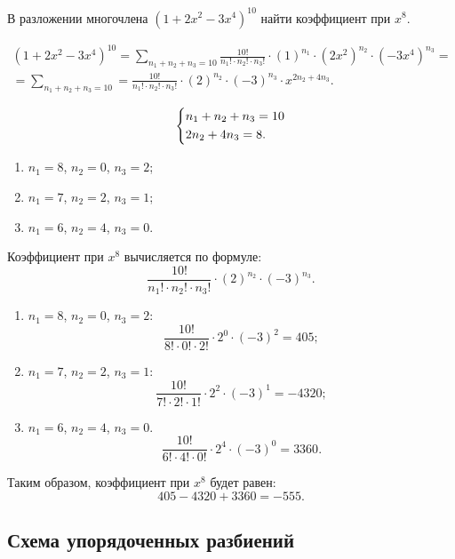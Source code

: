 \begin{example}
    В разложении многочлена \((1 + 2x^2 - 3x^4)^{10}\) найти коэффициент при \(x^8\).

    \begin{gather*}
        (1 + 2x^2 - 3x^4)^{10} =
        \sum_{n_1 + n_2 + n_3 = 10} \frac{10!}{n_1! \cdot n_2! \cdot n_3!} \cdot (1)^{n_1} \cdot (2x^2)^{n_2} \cdot (-3x^4)^{n_3} = \\ =
        \sum_{n_1 + n_2 + n_3 = 10} = \frac{10!}{n_1! \cdot n_2! \cdot n_3!} \cdot (2)^{n_2} \cdot (-3)^{n_3} \cdot x^{2n_2 + 4n_3}.
    \end{gather*}

    \[
        \begin{dcases}
            n_1 + n_2 + n_3 = 10 \\
            2n_2 + 4n_3 = 8.
        \end{dcases}
    \]

    \begin{enumerate}
        \item \(n_1 = 8\), \(n_2 = 0\), \(n_3 = 2\);
        \item \(n_1 = 7\), \(n_2 = 2\), \(n_3 = 1\);
        \item \(n_1 = 6\), \(n_2 = 4\), \(n_3 = 0\).
    \end{enumerate}

    Коэффициент при \(x^8\) вычисляется по формуле:
    \[
        \frac{10!}{n_1! \cdot n_2! \cdot n_3!} \cdot (2)^{n_2} \cdot (-3)^{n_3}.
    \]

    \begin{enumerate}
        \item \(n_1 = 8\), \(n_2 = 0\), \(n_3 = 2\):
              \[
                  \frac{10!}{8! \cdot 0! \cdot 2!} \cdot 2^0 \cdot (-3)^2 = 405;
              \]
        \item \(n_1 = 7\), \(n_2 = 2\), \(n_3 = 1\):
              \[
                  \frac{10!}{7! \cdot 2! \cdot 1!} \cdot 2^2 \cdot (-3)^1 = -4320;
              \]
        \item \(n_1 = 6\), \(n_2 = 4\), \(n_3 = 0\).
              \[
                  \frac{10!}{6! \cdot 4! \cdot 0!} \cdot 2^4 \cdot (-3)^0 = 3360.
              \]
    \end{enumerate}

    Таким образом, коэффициент при \(x^8\) будет равен:
    \[
        405 - 4320 + 3360 = -555.
    \]
\end{example}

\subsection{Схема упорядоченных разбиений}

